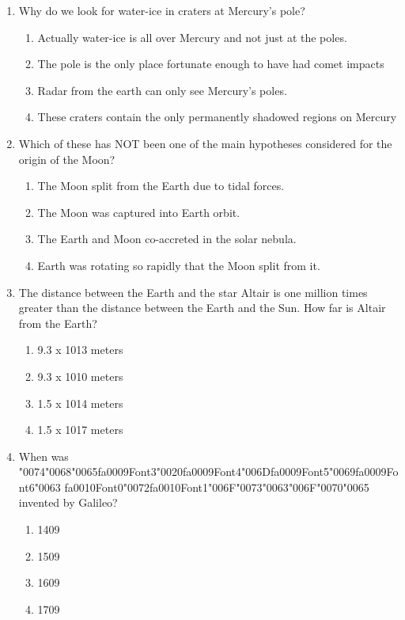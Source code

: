 \documentclass[12pt]{article}
\begin{document}
\begin{enumerate}[label=\arabic*.]
\item Why do we look for water-ice in craters at Mercury's pole?
\begin{enumerate}[label=(\alph*)]
    \item Actually water-ice is all over Mercury and not just at the poles.
    \item The pole is the only place fortunate enough to have had comet impacts
    \item Radar from the earth can only see Mercury's poles.
    \item These craters contain the only permanently shadowed regions on Mercury
\end{enumerate}
\item Which of these has NOT been one of the main hypotheses considered for the origin of the
Moon?
\begin{enumerate}[label=(\alph*)]
    \item The Moon split from the Earth due to tidal forces.
    \item The Moon was captured into Earth orbit.
    \item The Earth and Moon co-accreted in the solar nebula.
    \item Earth was rotating so rapidly that the Moon split from it.
\end{enumerate}
\item The distance between the Earth and the star Altair is one million times greater than the
distance between the Earth and the Sun. How far is Altair from the Earth?
\begin{enumerate}[label=(\alph*)]
    \item 9.3 x 1013 meters
    \item 9.3 x 1010 meters
    \item 1.5 x 1014 meters
    \item 1.5 x 1017 meters
\end{enumerate}
\item When was {\char"0074}{\char"0068}{\char"0065}{\csname fa0009Font3\endcsname\char"0020}{\csname fa0009Font4\endcsname\char"006D}{\csname fa0009Font5\endcsname\char"0069}{\csname fa0009Font6\endcsname\char"0063} {\csname fa0010Font0\endcsname\char"0072}{\csname fa0010Font1\endcsname\char"006F}{\char"0073}{\char"0063}{\char"006F}{\char"0070}{\char"0065} invented by Galileo?
\begin{enumerate}[label=(\alph*)]
    \item 1409
    \item 1509
    \item 1609
    \item 1709
\end{enumerate}
\end{enumerate}
\end{document}

